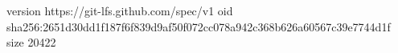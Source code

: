 version https://git-lfs.github.com/spec/v1
oid sha256:2651d30dd1f187f6f839d9af50f072cc078a942c368b626a60567c39e7744d1f
size 20422
